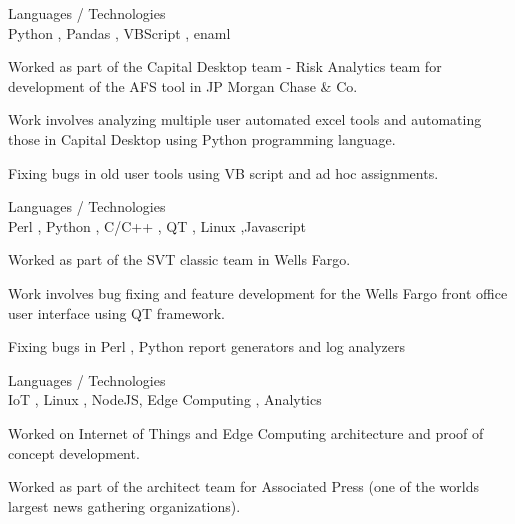\documentclass[a4,10pt]{cv4tw}
\begin{document}
{Languages / Technologies \\Python , Pandas , VBScript , enaml }
	{ 
	\begin{missions}
		\item Worked as part of the Capital Desktop team - Risk Analytics team for development of the AFS tool in JP Morgan Chase \& Co.
		\item Work involves analyzing multiple user automated excel tools and automating those in Capital Desktop using Python programming language.				
		\item Fixing bugs in old user tools using VB script and ad hoc assignments.
	\end{missions}
}
{Languages / Technologies \\Perl , Python , C/C++ , QT , Linux ,Javascript}
	{ 
	\begin{missions}
		\item Worked as part of the SVT classic team in Wells Fargo.
		\item Work involves bug fixing and feature development for the Wells Fargo front office user interface using QT framework.
		\item Fixing bugs in Perl , Python report generators and log analyzers
	\end{missions}
}


{Languages / Technologies \\ IoT , Linux , NodeJS, Edge Computing , Analytics }
	{ 
	\begin{missions}
		\item Worked on Internet of Things and Edge Computing architecture and proof of concept development.
		\item Worked as part of the architect team for Associated Press (one of the worlds largest news gathering organizations). 
	\end{missions}
}
\end{document}
